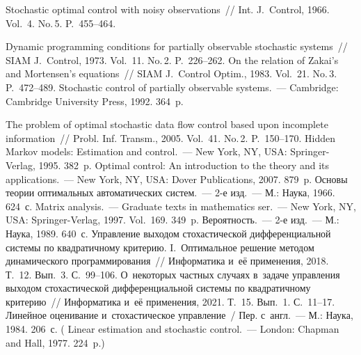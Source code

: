\begin{multicols}{2}
{{\begin{thebibliography}{99}
 Stochastic optimal control with noisy observations~// Int. J.~Control, 
1966. Vol.~4. No.\,5. P.~455--464.

 Dynamic programming conditions for partially 
observable stochastic systems~// SIAM J.~Control, 1973. Vol.~11. No.\,2. P.~226--262.
 On the relation of Zakai's and Mortensen's equations~// SIAM 
J.~Control Optim., 1983. Vol.~21. No.\,3. P.~472--489.
 Stochastic control of partially observable systems.~--- Cambridge: 
Cambridge University Press, 1992. 364~p.

 The problem of optimal 
stochastic data flow control based upon incomplete information~// Probl. Inf. 
Transm., 2005. Vol.~41. No.\,2. P.~150--170.
 Hidden Markov models: Estimation and  
control.~--- New York, NY, USA: Springer-Verlag, 1995. 382~p.
 Optimal control: An introduction to the theory and its 
applications.~--- New York, NY, USA: Dover Publications, 2007. 879~p.
 Основы теории оптимальных автоматических сис\-тем.~--- 2-е изд.~--- М.: Наука, 1966. 624~с.
 Matrix analysis.~--- Graduate texts in mathematics ser.~--- 
New York, NY, USA: Springer-Verlag,  1997. Vol.~169. 349~p.
 Вероятность.~--- 2-е изд.~--- М.: Наука, 1989. 640~с.
 Управление выходом стохастической 
дифференциальной системы по квад\-ра\-тич\-но\-му критерию. I.~Оптимальное решение 
методом динамического программирования~// Информатика и~её применения, 2018. 
Т.~12. Вып.~3. С.~99--106.
 О~некоторых частных случаях в~задаче управления 
выходом стохастической дифференциальной системы по квадратичному критерию~// 
Информатика и~её применения, 2021. Т.~15. Вып.~1. С.~11--17.
 Линейное оценивание и~стохастическое управление~/ Пер. 
с~англ.~--- М.: Наука, 1984. 206~с. ( Linear estimation and stochastic 
control.~--- London: Chapman and Hall, 1977. 224~p.)

 \end{thebibliography}

}
}

\end{multicols}

